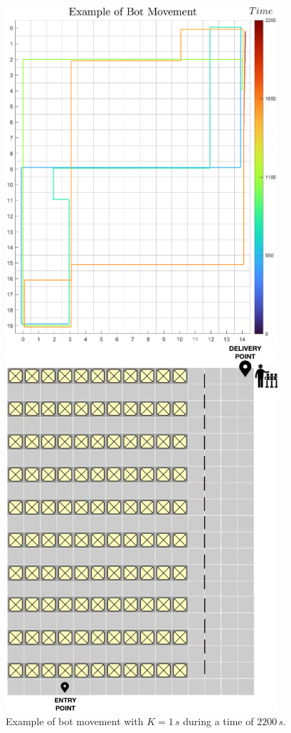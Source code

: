 \documentclass{article}
\begin{document}
				\begin{figure}[H]
					\centering
					\begin{minipage}{0.45\textwidth}
						\centering
						\includegraphics[width=0.9\textwidth]{./Images/BotMovement}
						\caption{Example of bot movement with $K=1\,s$ during a time of $2200\,s$.}
					\end{minipage}\hfill
					\begin{minipage}{0.45\textwidth}
						\centering
						\includegraphics[width=0.9\textwidth]{./Images/Grid.jpg}

\end{minipage}
\end{figure}
\end{document}
